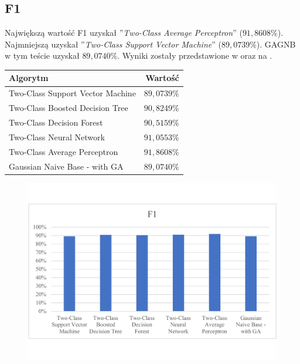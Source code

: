 \subsection{F1}
Największą wartość F1 uzyskał ''\textit{Two-Class Average Perceptron}'' ($91,8608\%$). Najmniejszą uzyskał ''\textit{Two-Class Support Vector Machine}'' ($89,0739\%$). GAGNB w tym teście uzyskał $89,0740\%$. Wyniki zostały przedstawione w  oraz na .

\begin{table}[H]
    \centering
    \begin{tabular}{|l|r|} \hline
    \textbf{Algorytm} & \textbf{Wartość} \\ \hline
    Two-Class Support Vector Machine & $89,0739\%$ \\ \hline
    Two-Class Boosted Decision Tree & $90,8249\%$ \\ \hline
    Two-Class Decision Forest & $90,5159\%$ \\ \hline
    Two-Class Neural Network & $91,0553\%$ \\ \hline
    Two-Class Average Perceptron & $91,8608\%$ \\ \hline
    Gaussian Naive Base - with GA & $89,0740\%$ \\ \hline
    \end{tabular}
    \label{tab:acc-f1}
\end{table}

\begin{figure}[H]
    \centering
    \includegraphics[width=\textwidth]{images/f1-res}
    \label{fig:f1-res}
\end{figure}

